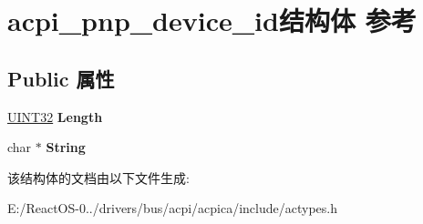 \hypertarget{structacpi__pnp__device__id}{}\section{acpi\+\_\+pnp\+\_\+device\+\_\+id结构体 参考}
\label{structacpi__pnp__device__id}
\subsection*{Public 属性}
\begin{DoxyCompactItemize}
\item 
\mbox{\label{structacpi__pnp__device__id_a91ac208b949d31811b9335e8d6f1a530}} 
\hyperlink{_processor_bind_8h_ae1e6edbbc26d6fbc71a90190d0266018}{U\+I\+N\+T32} {\bfseries Length}
\item 
\mbox{\label{structacpi__pnp__device__id_a99f1d028ae501dd8fadfff0cadfb9d07}} 
char $\ast$ {\bfseries String}
\end{DoxyCompactItemize}


该结构体的文档由以下文件生成\+:\begin{DoxyCompactItemize}
\item 
E\+:/\+React\+O\+S-\/0../drivers/bus/acpi/acpica/include/actypes.\+h\end{DoxyCompactItemize}
